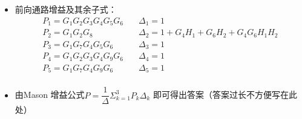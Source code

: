 \begin{example}
\begin{itemize}
\begin{equation*}
\begin{split}
                &+G_4 G_6 H_1 H_2+G_2 G_4 G_8 H_1 H_3+G_2 G_6 G_8 H_2 H_3
            \end{split}
        \end{equation*}
        \item[(5)] 前向通路增益及其余子式：
        \begin{equation*}
            \begin{split}
                P_1 = G_1 G_2 G_3 G_4 G_5 G_6 \quad &\Delta_1 = 1 \\
                P_2 = G_1 G_2 G_8 \quad &\Delta_2 = 1 + G_4 H_1 + G_6 H_2 +G_4 G_6 H_1 H_2 \\
                P_3 = G_1 G_7 G_4 G_5 G_6 \quad & \Delta_3 = 1 \\
                P_4 = G_1 G_2 G_3 G_4 G_9 G_6 \quad &\Delta_4 = 1 \\
                P_5 = G_1 G_7 G_4 G_9 G_6 \quad &\Delta_5 = 1 \\
            \end{split}
        \end{equation*}
        \item[(6)] 由Mason 增益公式$P = \dfrac{1}{\Delta} \Sigma_{k=1}^3 P_k \Delta_k$ 即可得出答案（答案过长不方便写在此处）
    \end{itemize}
\end{example}

